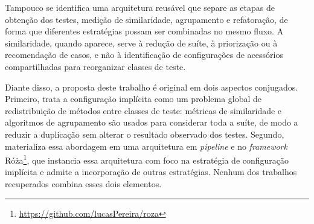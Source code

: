 Tampouco se identifica uma arquitetura reusável que separe as etapas de obtenção dos testes, medição de similaridade, agrupamento e refatoração, de forma que diferentes estratégias possam ser combinadas no mesmo fluxo. A similaridade, quando aparece, serve à redução de suíte, à priorização ou à recomendação de casos, e não à identificação de configurações de acessórios compartilhadas para reorganizar classes de teste.

Diante disso, a proposta deste trabalho é original em dois aspectos conjugados. Primeiro, trata a configuração implícita como um problema global de redistribuição de métodos entre classes de teste: métricas de similaridade e algoritmos de agrupamento são usados para considerar toda a suíte, de modo a reduzir a duplicação sem alterar o resultado observado dos testes. Segundo, materializa essa abordagem em uma arquitetura em \textit{pipeline} e no \textit{framework} Róża\footnote{\url{https://github.com/lucasPereira/roza}}, que instancia essa arquitetura com foco na estratégia de configuração implícita e admite a incorporação de outras estratégias. Nenhum dos trabalhos recuperados combina esses dois elementos.
